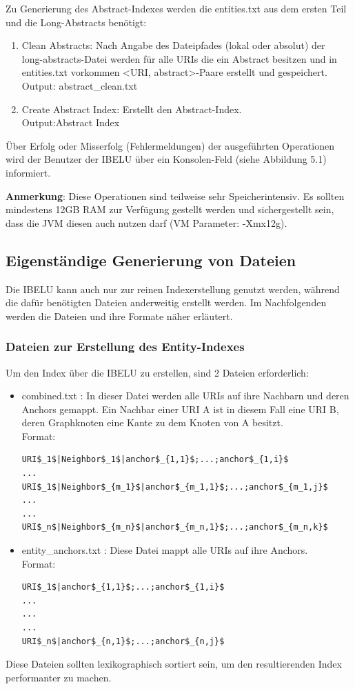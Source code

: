 \documentclass[11pt, a4paper, oneside]{Thesis} %
\begin{document}
Zu Generierung des Abstract-Indexes werden die entities.txt aus dem ersten Teil und die Long-Abstracts ben\"otigt:
\begin{enumerate}
\item Clean Abstracts: Nach Angabe des Dateipfades (lokal oder absolut) der\\ long-abstracts-Datei werden f\"ur alle URIs die ein Abstract besitzen und in entities.txt vorkommen \textless URI, abstract\textgreater-Paare erstellt und gespeichert.\\
Output: abstract\_clean.txt
\item Create Abstract Index: Erstellt den Abstract-Index.\\
Output:Abstract Index
\end{enumerate}
\"Uber Erfolg oder Misserfolg (Fehlermeldungen) der ausgef\"uhrten Operationen wird der Benutzer der IBELU \"uber ein Konsolen-Feld (siehe Abbildung 5.1) informiert.

\textbf{Anmerkung}: Diese Operationen sind teilweise sehr Speicherintensiv. Es sollten mindestens 12GB RAM zur Verf\"ugung gestellt werden und sichergestellt sein, dass die JVM diesen auch nutzen darf (VM Parameter: -Xmx12g).
\subsection{Eigenst\"andige Generierung von Dateien}
Die IBELU kann auch nur zur reinen Indexerstellung genutzt werden, w\"ahrend die daf\"ur ben\"otigten Dateien anderweitig erstellt werden. Im Nachfolgenden werden die Dateien und ihre Formate n\"aher erl\"autert.
\subsubsection*{Dateien zur Erstellung des Entity-Indexes}
Um den Index \"uber die IBELU zu erstellen, sind 2 Dateien erforderlich:
\begin{itemize}
\item combined.txt : In dieser Datei werden alle URIs auf ihre Nachbarn und deren Anchors gemappt. Ein Nachbar einer URI A ist in diesem Fall eine URI B, deren Graphknoten eine Kante zu dem Knoten von A besitzt.\\
Format:
\begin{lstlisting}
URI$_1$|Neighbor$_1$|anchor$_{1,1}$;...;anchor$_{1,i}$
...
URI$_1$|Neighbor$_{m_1}$|anchor$_{m_1,1}$;...;anchor$_{m_1,j}$
...
...
URI$_n$|Neighbor$_{m_n}$|anchor$_{m_n,1}$;...;anchor$_{m_n,k}$
\end{lstlisting}
\item entity\_anchors.txt : Diese Datei mappt alle URIs auf ihre Anchors.\\
Format:
\begin{lstlisting}
URI$_1$|anchor$_{1,1}$;...;anchor$_{1,i}$
...
...
...
URI$_n$|anchor$_{n,1}$;...;anchor$_{n,j}$
\end{lstlisting} 
\end{itemize}
Diese Dateien sollten lexikographisch sortiert sein, um den resultierenden Index performanter zu machen.
\end{document}
